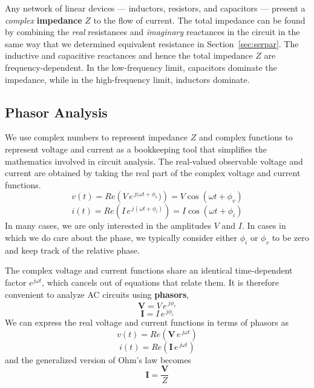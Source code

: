 \documentclass[11pt]{article}
\begin{document}
Any network of linear devices --- inductors, resistors, and capacitors
--- present a \emph{complex} \textbf{impedance} $Z$ to the flow of
current. The total impedance can be found by combining the \emph{real}
resistances and \emph{imaginary} reactances in the circuit in the same
way that we determined equivalent resistance in
Section~\ref{sec:serpar}. The inductive and capacitive reactances and
hence the total impedance $Z$ are frequency-dependent. In the
low-frequency limit, capacitors dominate the impedance, while in the
high-frequency limit, inductors dominate.

\subsection{Phasor Analysis}

We use complex numbers to represent impedance $Z$ and complex
functions to represent voltage and current as a bookkeeping tool that
simplifies the mathematics involved in circuit analysis. The
real-valued observable voltage and current are obtained by taking the
real part of the complex voltage and current functions.
\begin{equation}
  v(t) = Re \left(V \, e^{\,j(\omega t + \phi_v}) \right)
  = V \cos(\omega t + \phi_v)
\end{equation}
\begin{equation}
  i(t) = Re \left(I \, e^{\,j(\omega t + \phi_i)} \right)
  = I \cos(\omega t + \phi_i)
\end{equation}
In many cases, we are only interested in the amplitudes $V$ and
$I$. In cases in which we do care about the phase, we typically
consider either $\phi_i$ or $\phi_v$ to be zero and keep track of the
relative phase.

The complex voltage and current functions share an identical
time-dependent factor $e^{j \omega t}$, which cancels out of equations
that relate them. It is therefore convenient to analyze AC circuits
using \textbf{phasors},
\begin{equation}
  \mathbf{V} = V \, e^{\,j \phi_v}
\end{equation}
\begin{equation}
  \mathbf{I} = I \, e^{\,j \phi_i}
\end{equation}
We can express the real voltage and current functions in terms of
phasors as
\begin{equation}
  v(t) = Re(\mathbf{V} \, e^{\,j\omega t})
\end{equation}
\begin{equation}
  i(t) = Re(\mathbf{I} \, e^{\,j\omega t})
\end{equation}
and the generalized version of Ohm's law becomes
\begin{equation}
  \mathbf{I} = \frac{\mathbf{V}}{Z}
  \label{eq:genohmphasor}
\end{equation}
\end{document}
